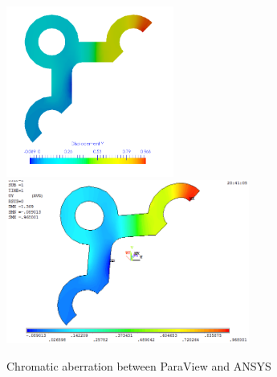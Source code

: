 \begin{figure}
	\begin{center}
		\includegraphics[width=5.5cm,clip]{ParaViewColor.png} 	
		\includegraphics[width=8cm,clip]{ANSYSColor.png} 	
		\caption{Chromatic aberration between ParaView and ANSYS} \label{fig: Color}
	\end{center}
\end{figure}
\clearpage 

